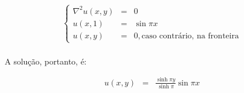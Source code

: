 \documentclass[validacao.tex]{subfiles}
\begin{document}
\begin{eqnarray}
\left\{\begin{array}{ccl}
\nabla^2u(x,y) & = & 0\\
u(x,1) & = & \sin \pi x\\
u(x,y) & = & 0, \textrm{caso contrário, na fronteira}
\end{array}\right.
\end{eqnarray}

\paragraph{} A solução, portanto, é:

\begin{eqnarray}
u(x,y) & = & \frac{\sinh\pi y}{\sinh\pi} \sin\pi x
\end{eqnarray}
\end{document}
